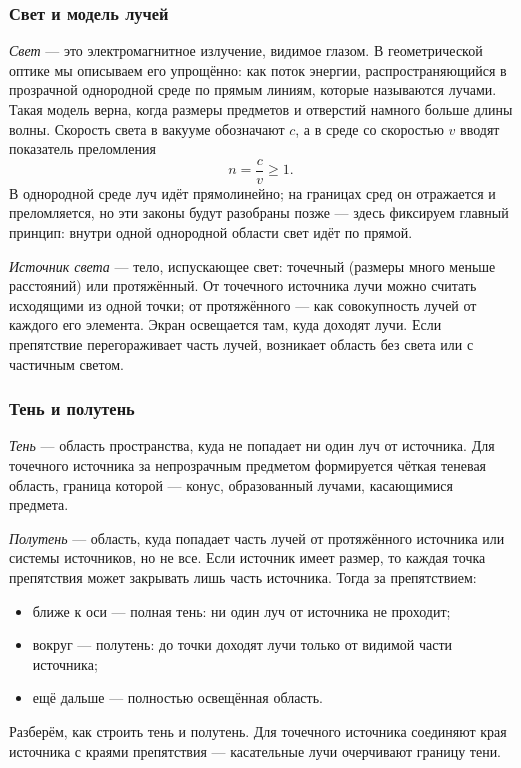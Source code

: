 \documentclass[12pt, a4paper]{article}%
\begin{document}
\subsubsection*{Свет и модель лучей}
\textit{Свет} — это электромагнитное излучение, видимое глазом. В геометрической оптике мы описываем его упрощённо: как поток энергии, распространяющийся в прозрачной однородной среде по прямым линиям, которые называются лучами. Такая модель верна, когда размеры предметов и отверстий намного больше длины волны. Скорость света в вакууме обозначают $c$, а в среде со скоростью $v$ вводят показатель преломления
\[
n = \frac{c}{v} \ge 1.
\]
В однородной среде луч идёт прямолинейно; на границах сред он отражается и преломляется, но эти законы будут разобраны позже — здесь фиксируем главный принцип: внутри одной однородной области свет идёт по прямой.

\textit{Источник света} — тело, испускающее свет: точечный (размеры много меньше расстояний) или протяжённый. От точечного источника лучи можно считать исходящими из одной точки; от протяжённого — как совокупность лучей от каждого его элемента. Экран освещается там, куда доходят лучи. Если препятствие перегораживает часть лучей, возникает область без света или с частичным светом.

\subsubsection*{Тень и полутень}
\textit{Тень} --- область пространства, куда не попадает ни один луч от источника. Для точечного источника за непрозрачным предметом формируется чёткая теневая область, граница которой — конус, образованный лучами, касающимися предмета.

\textit{Полутень} --- область, куда попадает часть лучей от протяжённого источника или системы источников, но не все. Если источник имеет размер, то каждая точка препятствия может закрывать лишь часть источника. Тогда за препятствием:
\begin{itemize}
  \item ближе к оси — полная тень: ни один луч от источника не проходит;
  \item вокруг — полутень: до точки доходят лучи только от видимой части источника;
  \item ещё дальше — полностью освещённая область.
\end{itemize}
Разберём, как строить тень и полутень. Для точечного источника соединяют края источника с краями препятствия — касательные лучи очерчивают границу тени.
\end{document}
